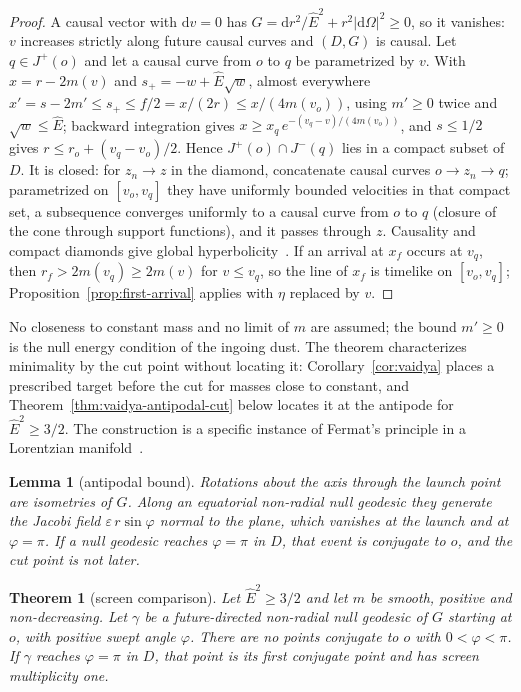 \documentclass[aip,jmp,amsmath,amssymb,reprint]{revtex4-2}
\newcommand{\Ehat}{\hat E}
\newcommand{\dd}{\mathrm{d}}
\theoremstyle{plain}
\newtheorem{theorem}{Theorem}
\newtheorem{lemma}[proposition]{Lemma}
\theoremstyle{definition}
\begin{document}
\begin{proof}
A causal vector with $\dd v=0$ has $G=\dd r^2/\Ehat^2+r^2|\dd\Omega|^2\ge0$, so it vanishes: $v$
increases strictly along future causal curves and $(D,G)$ is causal. Let $q\in J^+(o)$ and let a
causal curve from $o$ to $q$ be parametrized by $v$. With $x=r-2m(v)$ and $s_+=-w+\Ehat\sqrt w$,
almost everywhere
$x'=s-2m'\le s_+\le f/2=x/(2r)\le x/(4m(v_o))$, using $m'\ge0$ twice and $\sqrt w\le\Ehat$; backward
integration gives $x\ge x_q\,e^{-(v_q-v)/(4m(v_o))}$, and $s\le1/2$ gives $r\le r_o+(v_q-v_o)/2$. Hence
$J^+(o)\cap J^-(q)$ lies in a compact subset of $D$. It is closed: for $z_n\to z$ in the diamond,
concatenate causal curves $o\to z_n\to q$; parametrized on $[v_o,v_q]$ they have uniformly bounded
velocities in that compact set, a subsequence converges uniformly to a causal curve from $o$ to
$q$ (closure of the cone through support functions), and it passes through $z$. Causality and
compact diamonds give global hyperbolicity~\cite{BernalSanchez2007}. If an arrival at $x_f$ occurs
at $v_q$, then $r_f>2m(v_q)\ge2m(v)$ for $v\le v_q$, so the line of $x_f$ is timelike on
$[v_o,v_q]$; Proposition~\ref{prop:first-arrival} applies with $\eta$ replaced by $v$.
\end{proof}

No closeness to constant mass and no limit of $m$ are assumed; the bound $m'\ge0$ is the null
energy condition of the ingoing dust. The theorem characterizes minimality by the cut point
without locating it: Corollary~\ref{cor:vaidya} places a prescribed target before the cut for
masses close to constant, and Theorem~\ref{thm:vaidya-antipodal-cut} below locates it at the
antipode for $\Ehat^2\ge3/2$. The construction is a specific instance of Fermat's principle in a
Lorentzian manifold~\cite{PerlickRayOptics}.

\begin{lemma}[antipodal bound]\label{lem:vaidya-antipode}
Rotations about the axis through the launch point are isometries of $G$. Along an equatorial
non-radial null geodesic they generate the Jacobi field $\varepsilon\, r\sin\varphi$ normal to the
plane, which vanishes at the launch and at $\varphi=\pi$. If a null geodesic reaches $\varphi=\pi$ in
$D$, that event is conjugate to $o$, and the cut point is not later.
\end{lemma}

\begin{theorem}[screen comparison]\label{thm:vaidya-sturm}
Let $\Ehat^2\ge3/2$ and let $m$ be smooth, positive and non-decreasing. Let $\gamma$ be a
future-directed non-radial null geodesic of $G$ starting at $o$, with positive swept angle
$\varphi$. There are no points conjugate to $o$ with $0<\varphi<\pi$. If $\gamma$ reaches $\varphi=\pi$
in $D$, that point is its first conjugate point and has screen multiplicity one.
\end{theorem}
\end{document}
